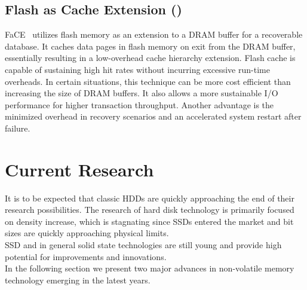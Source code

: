 \documentclass{acm_proc_article-sp}
\begin{document}
\subsection{Flash as Cache Extension ()}
FaCE~\cite{kang2012flash} utilizes flash memory as an extension to a DRAM buffer for a recoverable database. It caches data pages in flash memory on exit from the DRAM buffer, essentially resulting in a low-overhead cache hierarchy extension. Flash cache is capable of sustaining high hit rates without incurring excessive run-time overheads. In certain situations, this technique can be more cost efficient than increasing the size of DRAM buffers. It also allows a more sustainable I/O performance for higher transaction throughput. Another advantage is the minimized overhead in recovery scenarios and an accelerated system restart after failure.

\section{Current Research}
It is to be expected that classic HDDs are quickly approaching the end of their research possibilities. The research of hard disk technology is primarily focused on density increase, which is stagnating since SSDs entered the market and bit sizes are quickly approaching physical limits.
\\
SSD and in general solid state technologies are still young and provide high potential for improvements and innovations.
\\
In the following section we present two major advances in non-volatile memory technology emerging in the latest years.
\end{document}
